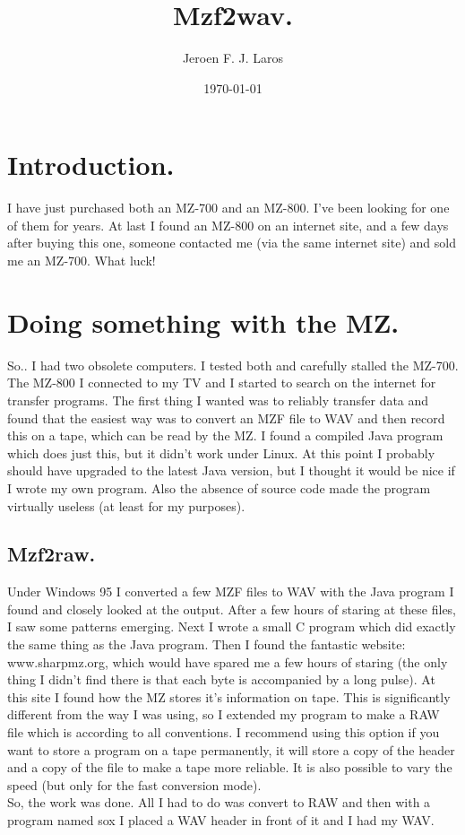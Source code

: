 \documentclass{article}
\title{\Huge Mzf2wav.}
\author{Jeroen F. J. Laros}
\date{\today}
\begin{document}
\maketitle
\newpage

\tableofcontents
\newpage

\section{Introduction.}
I have just purchased both an MZ-700 and an MZ-800. I've been looking for one 
of them for years. At last I found an MZ-800 on an internet site, and a few 
days after buying this one, someone contacted me (via the same internet site)
and sold me an MZ-700. What luck!

\section{Doing something with the MZ.}
So.. I had two obsolete computers. I tested both and carefully stalled the
MZ-700. The MZ-800 I connected to my TV and I started to search on the internet
for transfer programs. The first thing I wanted was to reliably transfer data
and found that the easiest way was to convert an MZF file to WAV and then 
record this on a tape, which can be read by the MZ. I found a compiled Java
program which does just this, but it didn't work under Linux. At this point
I probably should have upgraded to the latest Java version, but I thought it
would be nice if I wrote my own program. Also the absence of source code made
the program virtually useless (at least for my purposes).

\subsection{Mzf2raw.}
Under Windows 95 I converted a few MZF files to WAV with the Java program I
found and closely looked at the output. After a few hours of staring at these
files, I saw some patterns emerging. Next I wrote a small C program which did
exactly the same thing as the Java program. Then I found the fantastic website:
www.sharpmz.org, which would have spared me a few hours of staring (the only
thing I didn't find there is that each byte is accompanied by a long pulse).
At this site I found how the MZ stores it's information on tape. This is
significantly different from the way I was using, so I extended my program to
make a RAW file which is according to all conventions. I recommend using this
option if you want to store a program on a tape permanently, it will store a
copy of the header and a copy of the file to make a tape more reliable. It is
also possible to vary the speed (but only for the fast conversion mode). \\
So, the work was done. All I had to do was convert to RAW and then with a
program named sox I placed a WAV header in front of it and I had my WAV.
\end{document}
